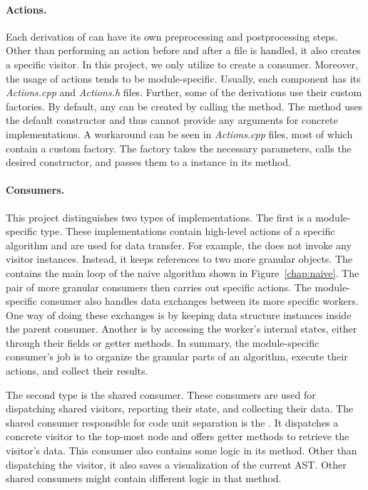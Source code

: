 \paragraph{Actions.} Each derivation of  can have 
its own preprocessing and postprocessing steps.
Other than performing an action before and after a file is handled, it also 
creates a specific visitor.
In this project, we only utilize  to create 
a consumer.
Moreover, the usage of actions tends to be module-specific. 
Usually, each component has its \emph{Actions.cpp} and \emph{Actions.h} files.
Further, some of the derivations use their custom factories.
By default, any  can be created by calling 
the  method.
The method uses the default constructor and thus cannot provide any 
arguments for concrete  implementations.
A workaround can be seen in \emph{Actions.cpp} files, most of which contain 
a custom factory.
The factory takes the necessary parameters, calls the desired constructor,
and passes them to a  instance in its  method.

\paragraph{Consumers.} This project distinguishes two types of 
 implementations. 
The first is a module-specific type. 
These  implementations contain high-level actions of 
a specific algorithm and are used for data transfer. 
For example, the  does not invoke any 
visitor instances. 
Instead, it keeps references to two more granular  objects. 
The  contains the main loop of the naive 
algorithm shown in Figure~\ref{chap:naive}. 
The pair of more granular consumers then carries out specific actions. 
The module-specific consumer also handles data exchanges between its more 
specific workers. 
One way of doing these exchanges is by keeping data structure instances 
inside the parent consumer. 
Another is by accessing the worker's internal states, either through their 
fields or getter methods. 
In summary, the module-specific consumer's job is to organize the granular 
parts of an algorithm, execute their actions, and collect their results.

The second  type is the shared consumer. 
These consumers are used for dispatching shared visitors, reporting their 
state, and collecting their data. 
The shared consumer responsible for code unit separation is 
the . 
It dispatches a concrete visitor to the top-most node and offers getter 
methods to retrieve the visitor's data. 
This consumer also contains some logic in its 
 method. 
Other than dispatching the visitor, it also saves a visualization of 
the current AST. 
Other shared consumers might contain different logic in that method.



